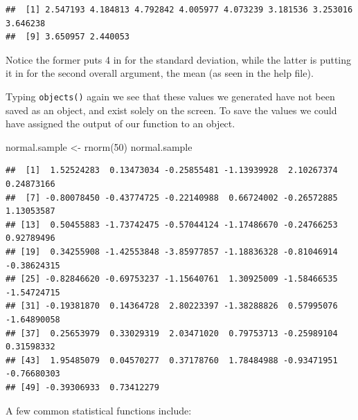 \documentclass[
]{book}
\newenvironment{Shaded}{\begin{snugshade}}{\end{snugshade}}
\newcommand{\DecValTok}[1]{\textcolor[rgb]{0.00,0.00,0.81}{#1}}
\newcommand{\FunctionTok}[1]{\textcolor[rgb]{0.00,0.00,0.00}{#1}}
\newcommand{\NormalTok}[1]{#1}
\newcommand{\OtherTok}[1]{\textcolor[rgb]{0.56,0.35,0.01}{#1}}
\begin{document}
\begin{verbatim}
##  [1] 2.547193 4.184813 4.792842 4.005977 4.073239 3.181536 3.253016 3.646238
##  [9] 3.650957 2.440053
\end{verbatim}

Notice the former puts 4 in for the standard deviation, while the latter is putting it in for the second overall argument, the mean (as seen in the help file).

Typing \texttt{objects()} again we see that these values we generated have not been saved as an object, and exist solely on the screen. To save the values we could have assigned the output of our function to an object.

\begin{Shaded}
\begin{Highlighting}[]
\NormalTok{normal.sample }\OtherTok{\textless{}{-}} \FunctionTok{rnorm}\NormalTok{(}\DecValTok{50}\NormalTok{)}
\NormalTok{normal.sample}
\end{Highlighting}
\end{Shaded}

\begin{verbatim}
##  [1]  1.52524283  0.13473034 -0.25855481 -1.13939928  2.10267374  0.24873166
##  [7] -0.80078450 -0.43774725 -0.22140988  0.66724002 -0.26572885  1.13053587
## [13]  0.50455883 -1.73742475 -0.57044124 -1.17486670 -0.24766253  0.92789496
## [19]  0.34255908 -1.42553848 -3.85977857 -1.18836328 -0.81046914 -0.38624315
## [25] -0.82846620 -0.69753237 -1.15640761  1.30925009 -1.58466535 -1.54724715
## [31] -0.19381870  0.14364728  2.80223397 -1.38288826  0.57995076 -1.64890058
## [37]  0.25653979  0.33029319  2.03471020  0.79753713 -0.25989104  0.31598332
## [43]  1.95485079  0.04570277  0.37178760  1.78484988 -0.93471951 -0.76680303
## [49] -0.39306933  0.73412279
\end{verbatim}

A few common statistical functions include:
\end{document}
